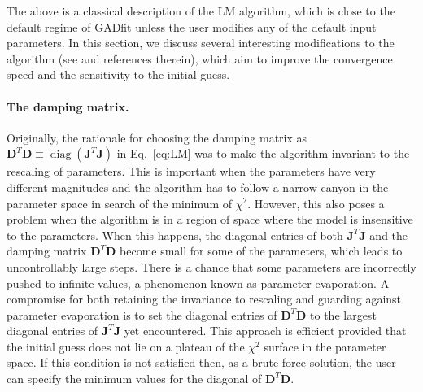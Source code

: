 \documentclass{article}
\DeclareMathOperator{\diag}{diag}
\begin{document}
The above is a classical description of the LM algorithm, which is close to the default regime of GADfit unless the user modifies any of the default input parameters. In this section, we discuss several interesting modifications to the algorithm (see \cite{transtrum10,   transtrum11, transtrum12} and references therein), which aim to improve the convergence speed and the sensitivity to the initial guess.

\paragraph{The damping matrix.} Originally, the rationale for choosing the damping matrix as $\bm D^T\bm D \equiv \diag(\bm J^T\bm J)$ in Eq.~\eqref{eq:LM} was to make the algorithm invariant to the rescaling of parameters. This is important when the parameters have very different magnitudes and the algorithm has to follow a narrow canyon in the parameter space in search of the minimum of $\chi^2$. However, this also poses a problem when the algorithm is in a region of space where the model is insensitive to the parameters. When this happens, the diagonal entries of both $\bm J^T\bm J$ and the damping matrix $\bm D^T\bm D$ become small for some of the parameters, which leads to uncontrollably large steps. There is a chance that some parameters are incorrectly pushed to infinite values, a phenomenon known as parameter evaporation. A compromise for both retaining the invariance to rescaling and guarding against parameter evaporation is to set the diagonal entries of $\bm D^T\bm D$ to the largest diagonal entries of $\bm J^T\bm J$ yet encountered. This approach is efficient provided that the initial guess does not lie on a plateau of the $\chi^2$ surface in the parameter space. If this condition is not satisfied then, as a brute-force solution, the user can specify the minimum values for the diagonal of $\bm D^T\bm D$.
\end{document}
